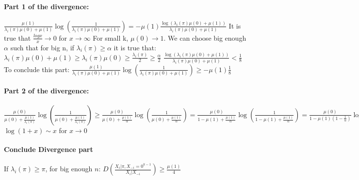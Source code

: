 \documentclass{article}
\theoremstyle{plain}
\begin{document}
\paragraph{Part 1 of the divergence:}
$\frac{\mu(1)}{\lambda_i(\pi)\mu(0) + \mu(1)} \log\left( \frac{1}{\lambda_i(\pi)\mu(0) + \mu(1)}\right) = -\mu(1) \frac{\log(\lambda_i(\pi)\mu(0) + \mu(1))}{\lambda_i(\pi)\mu(0) + \mu(1)}$ \newline
It is true that $\frac{logx}{x} \rightarrow 0$ for $x \rightarrow \infty$ \newline
For small k, $\mu(0) \rightarrow 1$. We can choose big enough $\alpha$ such that for big n, if $\lambda_i(\pi) \geq \alpha$ it is true that: \newline
$\lambda_i(\pi)\mu(0) + \mu(1) \geq \lambda_i(\pi)\mu(0) \geq \frac{\lambda_i(\pi)}{2} \geq \frac{\alpha}{2}$ \newline
$ \frac{\log(\lambda_i(\pi)\mu(0) + \mu(1))}{\lambda_i(\pi)\mu(0) + \mu(1)} < \frac{1}{8}$ \newline
To conclude this part:
$\frac{\mu(1)}{\lambda_i(\pi)\mu(0) + \mu(1)} \log\left( \frac{1}{\lambda_i(\pi)\mu(0) + \mu(1)}\right) \geq -\mu(1) \frac{1}{8}$
\paragraph{Part 2 of the divergence:}
$\frac{\mu(0)}{\mu(0) + \frac{\mu(1)}{\lambda_i(\pi)}}\log\left(\frac{1}{\mu(0) + \frac{\mu(1)}{\lambda_i(\pi)}}\right) \geq \frac{\mu(0)}{\mu(0) + \frac{\mu(1)}{\alpha}}\log\left(\frac{1}{\mu(0) + \frac{\mu(1)}{\alpha}}\right) = \frac{\mu(0)}{1 - \mu(1) + \frac{\mu(1)}{\alpha}}\log\left(\frac{1}{1 - \mu(1) + \frac{\mu(1)}{\alpha}}\right) = \frac{\mu(0)}{1 - \mu(1)(1 -\frac{1}{\alpha})}\log\left(\frac{1}{1 - \mu(1)(1 -\frac{1}{\alpha})}\right) = \frac{\mu(0)}{1 - \mu(1)(1 -\frac{1}{\alpha})}\log\left(1 + \frac{\mu(1)(1 -\frac{1}{\alpha})}{1 - \mu(1)(1 -\frac{1}{\alpha})}\right) \geq \frac{\mu(0)(\mu(1)(1 -\frac{1}{\alpha}))}{2\left(1 - \mu(1)(1 -\frac{1}{\alpha})\right)^2} \geq \frac{\mu(1)}{4}$ \newline
$\log(1+x) \sim x$ for $x \rightarrow 0$
\paragraph{Conclude Divergence part}
If $\lambda_i(\pi) \geq \pi$, for big enough $n$:
$D\left(\frac{X_i | \pi, X_{-i} = 0^{k-1}}{X_i | X_{-i}} \right) \geq \frac{\mu(1)}{4} $
\end{document}
